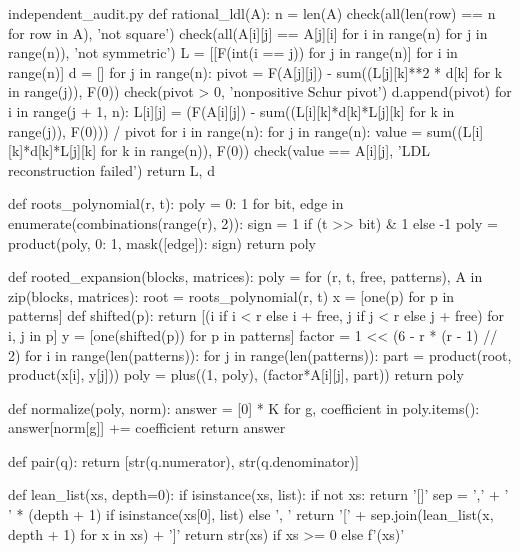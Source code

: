 \begin{filecontents*}[overwrite]{independent_audit.py}
def rational_ldl(A):
    n = len(A)
    check(all(len(row) == n for row in A), 'not square')
    check(all(A[i][j] == A[j][i] for i in range(n) for j in range(n)), 'not symmetric')
    L = [[F(int(i == j)) for j in range(n)] for i in range(n)]
    d = []
    for j in range(n):
        pivot = F(A[j][j]) - sum((L[j][k]**2 * d[k] for k in range(j)), F(0))
        check(pivot > 0, 'nonpositive Schur pivot')
        d.append(pivot)
        for i in range(j + 1, n):
            L[i][j] = (F(A[i][j]) - sum((L[i][k]*d[k]*L[j][k] for k in range(j)), F(0))) / pivot
    for i in range(n):
        for j in range(n):
            value = sum((L[i][k]*d[k]*L[j][k] for k in range(n)), F(0))
            check(value == A[i][j], 'LDL reconstruction failed')
    return L, d


def roots_polynomial(r, t):
    poly = {0: 1}
    for bit, edge in enumerate(combinations(range(r), 2)):
        sign = 1 if (t >> bit) & 1 else -1
        poly = product(poly, {0: 1, mask([edge]): sign})
    return poly


def rooted_expansion(blocks, matrices):
    poly = {}
    for (r, t, free, patterns), A in zip(blocks, matrices):
        root = roots_polynomial(r, t)
        x = [one(p) for p in patterns]
        def shifted(p):
            return [(i if i < r else i + free, j if j < r else j + free) for i, j in p]
        y = [one(shifted(p)) for p in patterns]
        factor = 1 << (6 - r * (r - 1) // 2)
        for i in range(len(patterns)):
            for j in range(len(patterns)):
                part = product(root, product(x[i], y[j]))
                poly = plus((1, poly), (factor*A[i][j], part))
    return poly


def normalize(poly, norm):
    answer = [0] * K
    for g, coefficient in poly.items():
        answer[norm[g]] += coefficient
    return answer


def pair(q):
    return [str(q.numerator), str(q.denominator)]


def lean_list(xs, depth=0):
    if isinstance(xs, list):
        if not xs:
            return '[]'
        sep = ',\n' + '  ' * (depth + 1) if isinstance(xs[0], list) else ', '
        return '[' + sep.join(lean_list(x, depth + 1) for x in xs) + ']'
    return str(xs) if xs >= 0 else f'({xs})'



\end{filecontents*}
